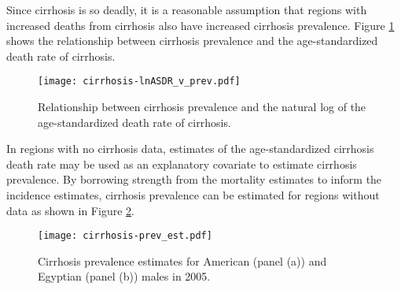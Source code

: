 Since cirrhosis is so deadly, it is a reasonable assumption that regions with increased deaths from cirrhosis also have increased cirrhosis prevalence.  Figure \ref{fig:app-cirrhosis asp} shows the relationship between cirrhosis prevalence and the age-standardized death rate of cirrhosis.

    \begin{figure}[h]
        \begin{center}
            \texttt{[image: cirrhosis-lnASDR\_v\_prev.pdf]}
            \caption{Relationship between cirrhosis prevalence and the natural log of the age-standardized death rate of cirrhosis.}
            \label{fig:app-cirrhosis asp}
        \end{center}
    \end{figure}

In regions with no cirrhosis data, estimates of the age-standardized cirrhosis death rate may be used as an explanatory covariate to estimate cirrhosis prevalence.  By borrowing strength from the mortality estimates to inform the incidence estimates, cirrhosis prevalence can be estimated for regions without data as shown in Figure \ref{fig:app-cirrhosis prev est}.

    \begin{figure}[h]
        \begin{center}
            \texttt{[image: cirrhosis-prev\_est.pdf]}
            \caption{Cirrhosis prevalence estimates for American (panel (a)) and Egyptian (panel (b)) males in 2005.}
            \label{fig:app-cirrhosis prev est}
        \end{center}
    \end{figure}
